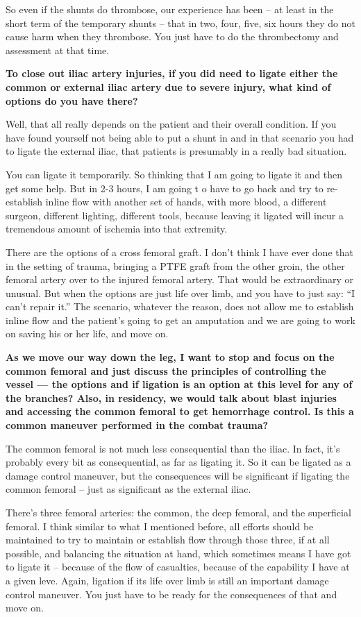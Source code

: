\documentclass[
]{book}
\begin{document}
So even if the shunts do thrombose, our experience has been -- at least
in the short term of the temporary shunts -- that in two, four, five,
six hours they do not cause harm when they thrombose. You just have to
do the thrombectomy and assessment at that time.

\textbf{To close out iliac artery injuries, if you did need to ligate either
the common or external iliac artery due to severe injury, what kind of
options do you have there?}

Well, that all really depends on the patient and their overall
condition. If you have found yourself not being able to put a shunt in
and in that scenario you had to ligate the external iliac, that patients
is presumably in a really bad situation.

You can ligate it temporarily. So thinking that I am going to ligate it
and then get some help. But in 2-3 hours, I am going t o have to go back
and try to re-establish inline flow with another set of hands, with more
blood, a different surgeon, different lighting, different tools, because
leaving it ligated will incur a tremendous amount of ischemia into that
extremity.

There are the options of a cross femoral graft. I don't think I have
ever done that in the setting of trauma, bringing a PTFE graft from the
other groin, the other femoral artery over to the injured femoral
artery. That would be extraordinary or unusual. But when the options are
just life over limb, and you have to just say: ``I can't repair it.'' The
scenario, whatever the reason, does not allow me to establish inline
flow and the patient's going to get an amputation and we are going to
work on saving his or her life, and move on.

\textbf{As we move our way down the leg, I want to stop and focus on the
common femoral and just discuss the principles of controlling the vessel
--- the options and if ligation is an option at this level for any of
the branches? Also, in residency, we would talk about blast injuries and
accessing the common femoral to get hemorrhage control. Is this a common
maneuver performed in the combat trauma?}

The common femoral is not much less consequential than the iliac. In
fact, it's probably every bit as consequential, as far as ligating it.
So it can be ligated as a damage control maneuver, but the consequences
will be significant if ligating the common femoral -- just as
significant as the external iliac.

There's three femoral arteries: the common, the deep femoral, and the
superficial femoral. I think similar to what I mentioned before, all
efforts should be maintained to try to maintain or establish flow
through those three, if at all possible, and balancing the situation at
hand, which sometimes means I have got to ligate it -- because of the
flow of casualties, because of the capability I have at a given leve.
Again, ligation if its life over limb is still an important damage
control maneuver. You just have to be ready for the consequences of that
and move on.
\end{document}
